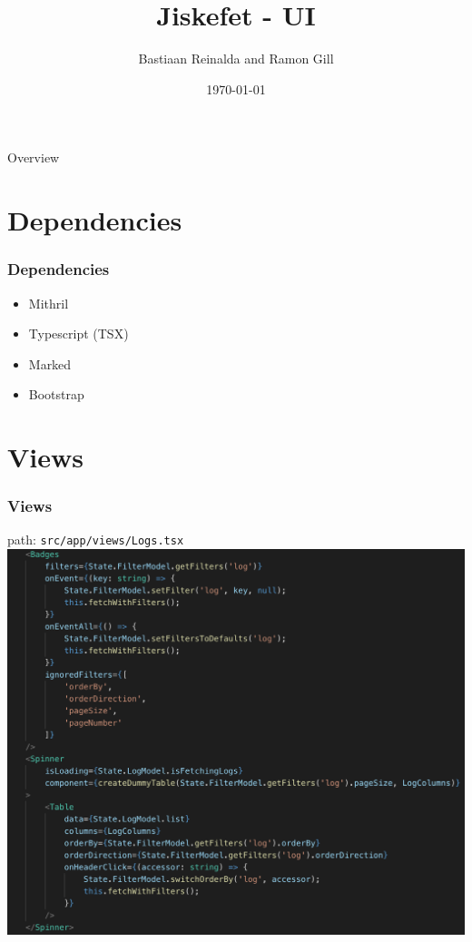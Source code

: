 \documentclass[12pt]{beamer}
\title{Jiskefet - UI}
\author{Bastiaan Reinalda and Ramon Gill}
\date{\today}
\begin{document}
	\begin{frame}
	\titlepage
	\end{frame}

	\begin{frame}{Overview}
		\tableofcontents
	\end{frame}

	\section{Dependencies}
	\begin{frame}
		\frametitle{Dependencies}
		\begin{itemize}
			\item Mithril
			\item Typescript (TSX)
			\item Marked
			\item Bootstrap
		\end{itemize}
	\end{frame}

	\section{Views}
	\begin{frame}
		\frametitle{Views}
		path: \texttt{src/app/views/Logs.tsx}
		\includegraphics[scale=.3]{../assets/logs-components.png}
	\end{frame}
\end{document}
